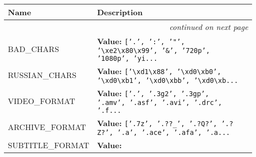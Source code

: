     \vspace{-1cm}
\hspace{\varindent}\begin{longtable}{|p{\varnamewidth}|p{\vardescrwidth}|l}
\cline{1-2}
\cline{1-2} \centering \textbf{Name} & \centering \textbf{Description}& \\
\cline{1-2}
\endhead\cline{1-2}\multicolumn{3}{r}{\small\textit{continued on next page}}\\\endfoot\cline{1-2}
\endlastfoot\raggedright B\-A\-D\-\_\-C\-H\-A\-R\-S\- & \raggedright \textbf{Value:} 
{\tt \texttt{[}\texttt{'}\texttt{.}\texttt{'}\texttt{, }\texttt{'}\texttt{:}\texttt{'}\texttt{, }\texttt{'}\texttt{"}\texttt{'}\texttt{, }\texttt{'}\texttt{{\textbackslash}xe2{\textbackslash}x80{\textbackslash}x99}\texttt{'}\texttt{, }\texttt{'}\texttt{\&}\texttt{'}\texttt{, }\texttt{'}\texttt{720p}\texttt{'}\texttt{, }\texttt{'}\texttt{1080p}\texttt{'}\texttt{, }\texttt{'}\texttt{yi}\texttt{...}}&\\
\cline{1-2}
\raggedright R\-U\-S\-S\-I\-A\-N\-\_\-C\-H\-A\-R\-S\- & \raggedright \textbf{Value:} 
{\tt \texttt{[}\texttt{'}\texttt{{\textbackslash}xd1{\textbackslash}x88}\texttt{'}\texttt{, }\texttt{'}\texttt{{\textbackslash}xd0{\textbackslash}xb0}\texttt{'}\texttt{, }\texttt{'}\texttt{{\textbackslash}xd0{\textbackslash}xb1}\texttt{'}\texttt{, }\texttt{'}\texttt{{\textbackslash}xd0{\textbackslash}xbb}\texttt{'}\texttt{, }\texttt{'}\texttt{{\textbackslash}xd0{\textbackslash}xb}\texttt{...}}&\\
\cline{1-2}
\raggedright V\-I\-D\-E\-O\-\_\-F\-O\-R\-M\-A\-T\- & \raggedright \textbf{Value:} 
{\tt \texttt{[}\texttt{'}\texttt{.}\texttt{'}\texttt{, }\texttt{'}\texttt{.3g2}\texttt{'}\texttt{, }\texttt{'}\texttt{.3gp}\texttt{'}\texttt{, }\texttt{'}\texttt{.amv}\texttt{'}\texttt{, }\texttt{'}\texttt{.asf}\texttt{'}\texttt{, }\texttt{'}\texttt{.avi}\texttt{'}\texttt{, }\texttt{'}\texttt{.drc}\texttt{'}\texttt{, }\texttt{'}\texttt{.f}\texttt{...}}&\\
\cline{1-2}
\raggedright A\-R\-C\-H\-I\-V\-E\-\_\-F\-O\-R\-M\-A\-T\- & \raggedright \textbf{Value:} 
{\tt \texttt{[}\texttt{'}\texttt{.7z}\texttt{'}\texttt{, }\texttt{'}\texttt{.??\_}\texttt{'}\texttt{, }\texttt{'}\texttt{.?Q?}\texttt{'}\texttt{, }\texttt{'}\texttt{.?Z?}\texttt{'}\texttt{, }\texttt{'}\texttt{.a}\texttt{'}\texttt{, }\texttt{'}\texttt{.ace}\texttt{'}\texttt{, }\texttt{'}\texttt{.afa}\texttt{'}\texttt{, }\texttt{'}\texttt{.a}\texttt{...}}&\\
\cline{1-2}
\raggedright S\-U\-B\-T\-I\-T\-L\-E\-\_\-F\-O\-R\-M\-A\-T\- & \raggedright \textbf{Value:} 

\end{longtable}

